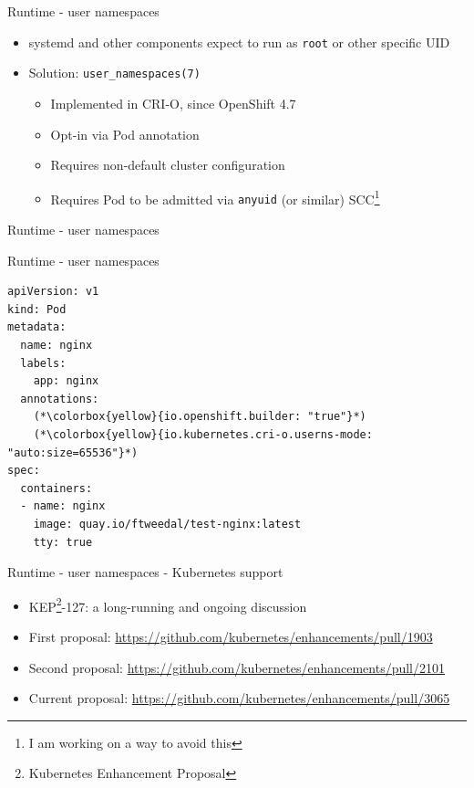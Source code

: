 \documentclass[ignorenonframetext,aspectratio=169,12pt]{beamer}
\def\svgwidth{4cm}
\begin{document}
\begin{frame}{Runtime - user namespaces}
\protect\hypertarget{freeipa-openshift-runtime-userns}{}
\begin{itemize}
\item systemd and other components expect to run as {\tt root} or
  other specific UID
\item Solution: {\tt user\_namespaces(7)}
  \begin{itemize}
  \item Implemented in CRI-O, since OpenShift 4.7
  \item Opt-in via Pod annotation
  \item Requires non-default cluster configuration
  \item Requires Pod to be admitted via {\tt anyuid} (or
      similar) SCC\footnote{I am working on a way to avoid this}
  \end{itemize}
\end{itemize}
\end{frame}

\begin{frame}{Runtime - user namespaces}
\protect\hypertarget{runtime-userns-figure}{}
\begin{center}
\def\svgwidth{\textwidth}

\end{center}
\end{frame}

\begin{frame}[fragile]{Runtime - user namespaces}
\protect\hypertarget{runtime-userns-spec}{}
\begin{lstlisting}
apiVersion: v1
kind: Pod
metadata:
  name: nginx
  labels:
    app: nginx
  annotations:
    (*\colorbox{yellow}{io.openshift.builder: "true"}*)
    (*\colorbox{yellow}{io.kubernetes.cri-o.userns-mode: "auto:size=65536"}*)
spec:
  containers:
  - name: nginx
    image: quay.io/ftweedal/test-nginx:latest
    tty: true
\end{lstlisting}
\end{frame}

\begin{frame}{Runtime - user namespaces - Kubernetes support}
\protect\hypertarget{runtime-userns-kubernetes}{}
\begin{itemize}
\item KEP\footnote{Kubernetes Enhancement Proposal}-127: a long-running and ongoing discussion
\item First proposal: \url{https://github.com/kubernetes/enhancements/pull/1903}
\item Second proposal: \url{https://github.com/kubernetes/enhancements/pull/2101}
\item Current proposal: \url{https://github.com/kubernetes/enhancements/pull/3065}
\end{itemize}
\end{frame}
\end{document}
